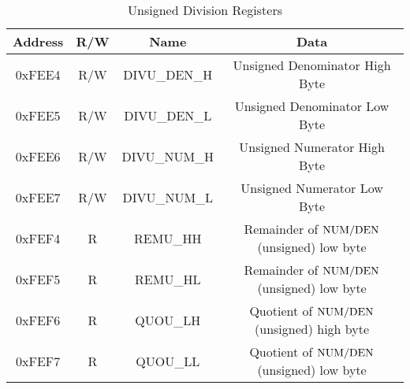 \begin{table}[ht]
    \begin{center}
        \begin{tabular}{|c|c|c|c|} \hline
            Address & R/W & Name & Data \\\hline\hline
            0xFEE4  & R/W & DIVU\_DEN\_H & Unsigned Denominator High Byte \\\hline
            0xFEE5  & R/W & DIVU\_DEN\_L & Unsigned Denominator Low Byte \\\hline
            0xFEE6  & R/W & DIVU\_NUM\_H & Unsigned Numerator High Byte \\\hline
            0xFEE7  & R/W & DIVU\_NUM\_L & Unsigned Numerator Low Byte \\\hline
            0xFEF4  & R   & REMU\_HH   & Remainder of ${\rm NUM} / {\rm DEN}$ (unsigned) low byte \\\hline  
            0xFEF5  & R   & REMU\_HL   & Remainder of ${\rm NUM} / {\rm DEN}$ (unsigned) low byte \\\hline
            0xFEF6  & R   & QUOU\_LH   & Quotient of ${\rm NUM} / {\rm DEN}$ (unsigned) high byte \\\hline
            0xFEF7  & R   & QUOU\_LL   & Quotient of ${\rm NUM} / {\rm DEN}$ (unsigned) low byte \\\hline
        \end{tabular}
    \end{center}
    \caption{Unsigned Division Registers}
    \label{tab:math_div_reg}
\end{table}

